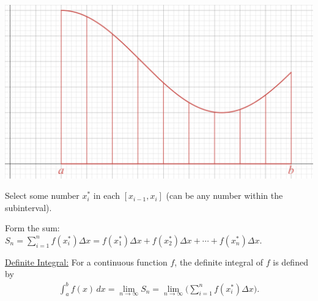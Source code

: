 \documentclass[12pt,a4paper]{article}
\newcommand{\ra}{\rightarrow}
\begin{document}
	\begin{center}
	\includegraphics[scale=0.37]{regionSDivided.png}
	\end{center}
	
\textbullet Select some number $x_i^\ast$ in each $[x_{i-1}, x_{i}]$ (can be any number within the subinterval).

\textbullet Form the sum: $\displaystyle S_n = \sum_{i = 1}^{n} f (x_i^{\ast}) \Delta x = f(x_1^{\ast}) \Delta x + f(x_2^\ast) \Delta x + \cdots + f (x_{n}^\ast) \Delta x .$

\newpage

\underline{Definite Integral:} For a continuous function $f$, the definite integral of $f$ is defined by
	\begin{align*}
	\int_a^b f (x) \, dx = \lim_{n \ra \infty} S_n = \lim_{n \ra \infty} \Big( \sum_{i = 1}^{n} f (x_i^{\ast}) \Delta x \Big) .
	\end{align*}
	
\end{document}
